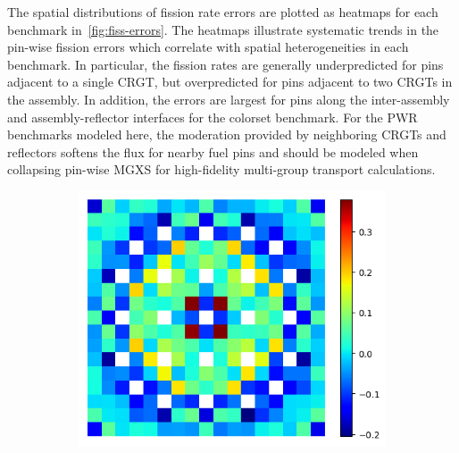 The spatial distributions of fission rate errors are plotted as heatmaps for each benchmark in~\autoref{fig:fiss-errors}. The heatmaps illustrate systematic trends in the pin-wise fission errors which correlate with spatial heterogeneities in each benchmark. In particular, the fission rates are generally underpredicted for pins adjacent to a single CRGT, but overpredicted for pins adjacent to two CRGTs in the assembly. In addition, the errors are largest for pins along the inter-assembly and assembly-reflector interfaces for the colorset benchmark. For the PWR benchmarks modeled here, the moderation provided by neighboring CRGTs and reflectors softens the flux for nearby fuel pins and should be modeled when collapsing pin-wise MGXS for high-fidelity multi-group transport calculations.

\begin{figure}[h!]
\centering
\begin{subfigure}{0.45\textwidth}
  \centering
  \includegraphics[width=\linewidth]{figures/assembly/fiss-null-errors}
  \caption{}
  \label{fig:assm-fiss-null-error}
\end{subfigure}%
\begin{subfigure}{0.45\textwidth}
  \centering

\end{subfigure}
\end{figure}
